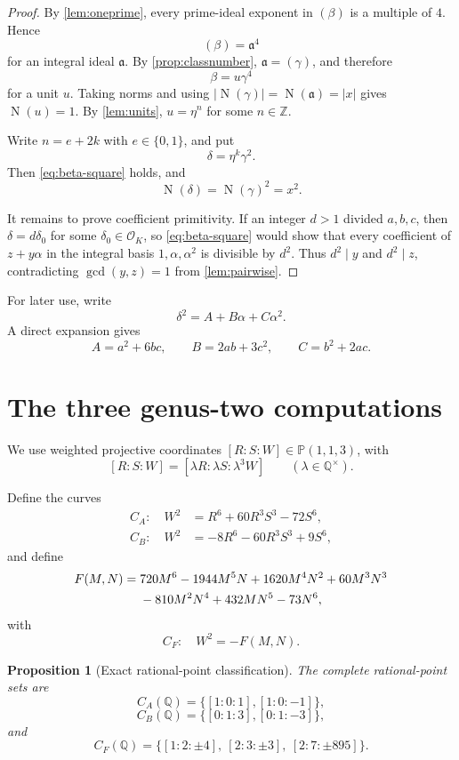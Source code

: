 \documentclass[11pt,a4paper]{article}
\newtheorem{proposition}[proposition]{Proposition}
\newcommand{\Z}{\mathbb Z}
\newcommand{\Q}{\mathbb Q}
\newcommand{\OK}{\mathcal O_K}
\newcommand{\Norm}{\operatorname{N}}
\newcommand{\etaunit}{\eta}
\begin{document}
\begin{proof}
By \cref{lem:oneprime}, every prime-ideal exponent in $(\beta)$ is a
multiple of $4$.  Hence
\[
(\beta)=\mathfrak a^4
\]
for an integral ideal $\mathfrak a$.  By \cref{prop:classnumber},
$\mathfrak a=(\gamma)$, and therefore
\[
\beta=u\gamma^4
\]
for a unit $u$.  Taking norms and using
$|\Norm(\gamma)|=\Norm(\mathfrak a)=|x|$ gives $\Norm(u)=1$.  By
\cref{lem:units}, $u=\etaunit^n$ for some $n\in\Z$.

Write $n=e+2k$ with $e\in\{0,1\}$, and put
\[
\delta=\etaunit^k\gamma^2.
\]
Then \eqref{eq:beta-square} holds, and
\[
\Norm(\delta)=\Norm(\gamma)^2=x^2.
\]

It remains to prove coefficient primitivity.  If an integer $d>1$ divided
$a,b,c$, then $\delta=d\delta_0$ for some $\delta_0\in\OK$, so
\eqref{eq:beta-square} would show that every coefficient of $z+y\alpha$
in the integral basis $1,\alpha,\alpha^2$ is divisible by $d^2$.
Thus $d^2\mid y$ and $d^2\mid z$, contradicting
$\gcd(y,z)=1$ from \cref{lem:pairwise}.
\end{proof}

For later use, write
\[
\delta^2=A+B\alpha+C\alpha^2.
\]
A direct expansion gives
\begin{equation}\label{eq:ABC}
A=a^2+6bc,
\qquad
B=2ab+3c^2,
\qquad
C=b^2+2ac.
\end{equation}

\section{The three genus-two computations}

We use weighted projective coordinates
$[R:S:W]\in\mathbb P(1,1,3)$, with
\[
[R:S:W]=[\lambda R:\lambda S:\lambda^3W]
\qquad(\lambda\in\Q^\times).
\]

Define the curves
\begin{align}
C_A:\quad
W^2&=R^6+60R^3S^3-72S^6,
\label{eq:CA}\\
C_B:\quad
W^2&=-8R^6-60R^3S^3+9S^6,
\label{eq:CB}
\end{align}
and define
\begin{align}
F(M,N)={}&720M^6-1944M^5N+1620M^4N^2+60M^3N^3
\notag\\
&-810M^2N^4+432MN^5-73N^6,
\label{eq:F}
\end{align}
with
\begin{equation}\label{eq:CF}
C_F:\quad W^2=-F(M,N).
\end{equation}

\begin{proposition}[Exact rational-point classification]\label{prop:genus2}
The complete rational-point sets are
\[
C_A(\Q)=\{[1:0:1],[1:0:-1]\},
\]
\[
C_B(\Q)=\{[0:1:3],[0:1:-3]\},
\]
and
\[
C_F(\Q)=
\{[1:2:\pm4],\ [2:3:\pm3],\ [2:7:\pm895]\}.
\]
\end{proposition}
\end{document}
